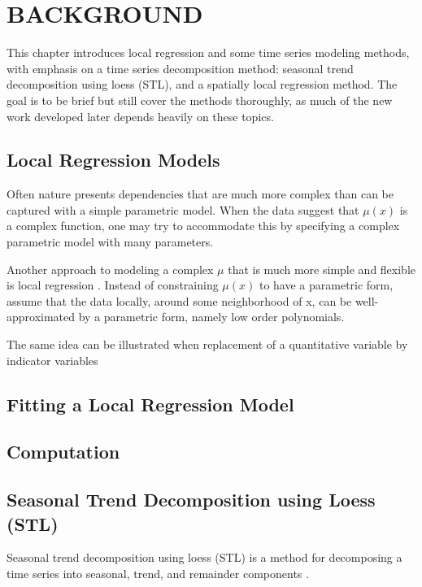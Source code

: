 \chapter{BACKGROUND}

This chapter introduces local regression and some time series modeling methods,
with emphasis on a time series decomposition method: seasonal trend decomposition
using loess (STL), and a spatially local regression method. The goal is to be
brief but still cover the methods thoroughly, as much of the new work developed
later depends heavily on these topics.

\section{Local Regression Models}

Often nature presents dependencies that are much more complex than can be captured
with a simple parametric model. When the data suggest that $\mu(x)$ is a complex
function, one may try to accommodate this by specifying a complex parametric model
with many parameters.

Another approach to modeling a complex $\mu$ that is much more simple and flexible
is local regression \cite{Cleveland:1979}. Instead of constraining $\mu(x)$ to 
have a parametric form, assume that the data locally, around some neighborhood of
x, can be well-approximated by a parametric form, namely low order polynomials.

The same idea can be illustrated when replacement of a quantitative variable by
indicator variables 

\section{Fitting a Local Regression Model}


\section{Computation}

\section{Seasonal Trend Decomposition using Loess (STL)}

Seasonal trend decomposition using loess (STL) is a method for decomposing a time
series into seasonal, trend, and remainder components \cite{Cleveland:1990}.


